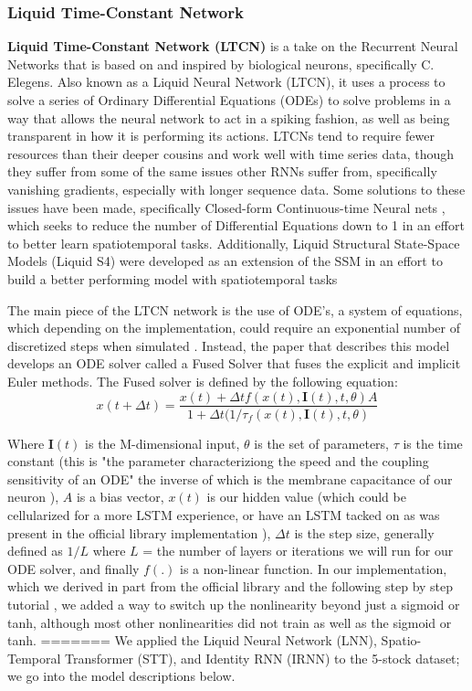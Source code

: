 \documentclass[10pt,twocolumn,letterpaper]{article}
\begin{document}
\subsubsection{Liquid Time-Constant Network}

\textbf{Liquid Time-Constant Network (LTCN)} \cite{hasani_liquid_2020} is a take on the Recurrent Neural Networks that is based on and inspired by biological neurons, specifically C. Elegens. Also known as a Liquid Neural Network (LTCN), it uses a process to solve a series of Ordinary Differential Equations (ODEs) to solve problems in a way that allows the neural network to act in a spiking fashion, as well as being transparent in how it is performing its actions. LTCNs tend to require fewer resources than their deeper cousins and work well with time series data, though they suffer from some of the same issues other RNNs suffer from, specifically vanishing gradients, especially with longer sequence data. Some solutions to these issues have been made, specifically Closed-form Continuous-time Neural nets \cite{CfC_LTC}, which seeks to reduce the number of Differential Equations down to 1 in an effort to better learn spatiotemporal tasks. Additionally, Liquid Structural State-Space Models (Liquid S4) were developed as an extension of the SSM in an effort to build a better performing model with spatiotemporal tasks \cite{hasani2022liquid}

        The main piece of the LTCN network is the use of ODE's, a system of equations, which depending on the implementation, could require an exponential number of discretized steps when simulated \cite{hasani_liquid_2020}. Instead, the paper that describes this model develops an ODE solver called a Fused Solver that fuses the explicit and implicit Euler methods. The Fused solver is defined by the following equation:
\begin{equation}
    x(t + \Delta t) = \frac{x(t) + \Delta t f(x(t), \textbf{I}(t), t, \theta)A}{1 + \Delta t(1/\tau _ f(x(t), \textbf{I}(t), t, \theta)}
\end{equation}

        Where $\textbf{I}(t)$ is the M-dimensional input, $\theta$ is the set of parameters, $\tau$
        is the time constant (this is "the parameter characteriziong the speed and the coupling sensitivity of an ODE" \cite{hasani_liquid_2020} the inverse of which is the membrane capacitance of our neuron \cite{LTCN_Tutorial}), $A$ is a bias vector, $x(t)$ is our hidden value (which could be cellularized for a more LSTM experience, or have an LSTM tacked on as was present in the official library implementation \cite{NCP_Github}), $\Delta t$ is the step size, generally defined as $1 / L$ where $L$ = the number of layers or iterations we will run for our ODE solver, and finally $f(.)$ is a non-linear function. In our implementation, which we derived in part from the official library \cite{NCP_Github} and the following step by step tutorial \cite{LTCN_Tutorial}, we added a way to switch up the nonlinearity beyond just a sigmoid or tanh, although most other nonlinearities did not train as well as the sigmoid or tanh.
=======
We applied the Liquid Neural Network (LNN), Spatio-Temporal Transformer (STT), and Identity RNN (IRNN) to the 5-stock dataset; we go into the model descriptions below.
\end{document}
